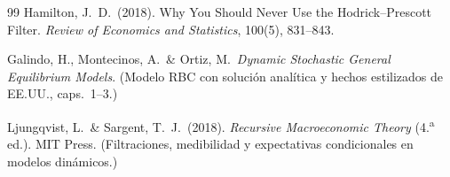 \documentclass[11pt,a4paper]{report}
\begin{document}
\begin{thebibliography}{99}
 Hamilton, J.~D.\ (2018). Why You Should Never Use the
Hodrick--Prescott Filter. \emph{Review of Economics and Statistics}, 100(5),
831--843.

 Galindo, H., Montecinos, A.\ \& Ortiz, M.\ \emph{Dynamic Stochastic
General Equilibrium Models}. (Modelo RBC con solución analítica y hechos
estilizados de EE.UU., caps.\ 1--3.)

 Ljungqvist, L.\ \& Sargent, T.~J.\ (2018). \emph{Recursive
Macroeconomic Theory} (4.\textsuperscript{a} ed.). MIT Press. (Filtraciones,
medibilidad y expectativas condicionales en modelos dinámicos.)

\end{thebibliography}
\end{document}
